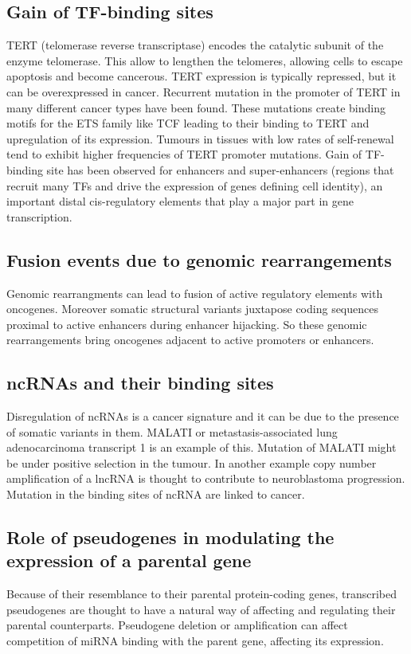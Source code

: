 	\subsection{Gain of TF-binding sites}
	TERT (telomerase reverse transcriptase) encodes the catalytic subunit of the enzyme telomerase.
	This allow to lengthen the telomeres, allowing cells to escape apoptosis and become cancerous.
	TERT expression is typically repressed, but it can be overexpressed in cancer.
	Recurrent mutation in the promoter of TERT in many different cancer types have been found.
	These mutations create binding motifs for the ETS family like TCF leading to their binding to TERT and upregulation of its expression.
	Tumours in tissues with low rates of self-renewal tend to exhibit higher frequencies of TERT promoter mutations.
	Gain of TF-binding site has been observed for enhancers and super-enhancers (regions that recruit many TFs and drive the expression of genes defining cell identity), an important distal cis-regulatory elements that play a major part in gene transcription.

	\subsection{Fusion events due to genomic rearrangements}
	Genomic rearrangments can lead to fusion of active regulatory elements with oncogenes.
	Moreover somatic structural variants juxtapose coding sequences proximal to active enhancers during enhancer hijacking.
	So these genomic rearrangements bring oncogenes adjacent to active promoters or enhancers.

	\subsection{ncRNAs and their binding sites}
	Disregulation of ncRNAs is a cancer signature and it can be due to the presence of somatic variants in them.
	MALATI or metastasis-associated lung adenocarcinoma transcript 1 is an example of this.
	Mutation of MALATI might be under positive selection in the tumour.
	In another example copy number amplification of a lncRNA is thought to contribute to neuroblastoma progression.
	Mutation in the binding sites of ncRNA are linked to cancer.

	\subsection{Role of pseudogenes in modulating the expression of a parental gene}
	Because of their resemblance to their parental protein-coding genes, transcribed pseudogenes are thought to have a natural way of affecting and regulating their parental counterparts.
	Pseudogene deletion or amplification can affect competition of miRNA binding with the parent gene, affecting its expression.

